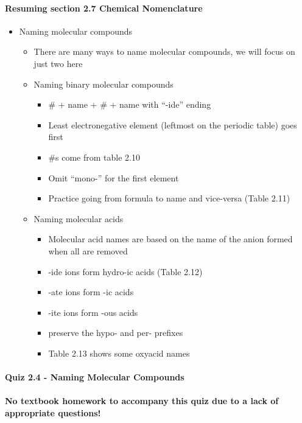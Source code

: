 \documentclass[12pt, openany, letterpaper]{memoir}
\begin{document}
\paragraph*{Resuming section 2.7 Chemical Nomenclature}
\begin{itemize}
  \item Naming molecular compounds
  \begin{itemize}
    \item There are many ways to name molecular compounds, we will focus on just two here
    \item Naming binary molecular compounds
    \begin{itemize}
      \item \# + name + \# + name with ``-ide'' ending
      \item Least electronegative element (leftmost on the periodic table) goes first
      \item \#s come from table 2.10
      \item Omit ``mono-'' for the first element
      \item Practice going from formula to name and vice-versa (Table 2.11)
    \end{itemize}
    \item Naming molecular acids
    \begin{itemize}
      \item Molecular acid names are based on the name of the anion formed when all  are removed
      \item -ide ions form hydro-ic acids (Table 2.12)
      \item -ate ions form -ic acids
      \item -ite ions form -ous acids
      \item preserve the hypo- and per- prefixes
      \item Table 2.13 shows some oxyacid names
    \end{itemize}
  \end{itemize}
\end{itemize}

\paragraph*{Quiz 2.4 - Naming Molecular Compounds}
\paragraph*{No textbook homework to accompany this quiz due to a lack of appropriate questions!}
\end{document}
